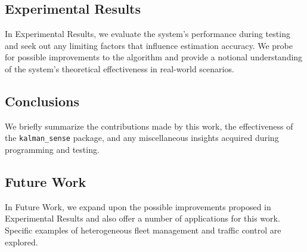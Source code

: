 \subsection*{Experimental Results}

In Experimental Results, we evaluate the system's performance during testing and seek out any limiting factors that influence estimation accuracy. We probe for possible improvements to the algorithm and provide a notional understanding of the system's theoretical effectiveness in real-world scenarios.

\subsection*{Conclusions}

We briefly summarize the contributions made by this work, the effectiveness of the \texttt{kalman\_sense} package, and any miscellaneous insights acquired during programming and testing. 

\subsection*{Future Work}

In Future Work, we expand upon the possible improvements proposed in Experimental Results and also offer a number of applications for this work. Specific examples of heterogeneous fleet management and traffic control are explored.